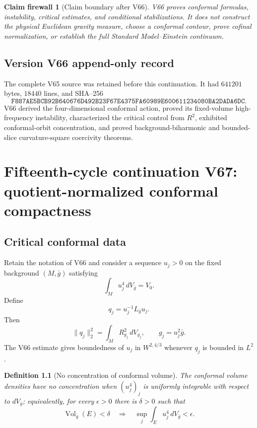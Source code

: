 \documentclass[11pt]{article}
\newtheorem{definition}[theorem]{Definition}
\newtheorem{firewall}[theorem]{Claim firewall}
\theoremstyle{remark}
\begin{document}
\begin{firewall}[Claim boundary after V66]
\label{fire:v15v66}
V66 proves conformal formulas, instability, critical estimates,
and conditional stabilizations.  It does not construct the
physical Euclidean gravity measure, choose a conformal contour,
prove cofinal normalization, or establish the full
Standard Model--Einstein continuum.
\end{firewall}

\section*{Version V66 append-only record}
The complete V65 source was retained before this continuation.  It
had \(641201\) bytes, \(18440\) lines, and SHA--256
\[
 \texttt{F887AE5BCB92B640676D492B23F67E4375FA60989E600611234080BA2DADA6DC}.
\]
V66 derived the four-dimensional conformal action, proved its
fixed-volume high-frequency instability, characterized the
critical control from \(R^2\), exhibited conformal-orbit
concentration, and proved background-biharmonic and bounded-slice
curvature-square coercivity theorems.

\chapter{Fifteenth-cycle continuation V67: quotient-normalized conformal compactness}
\label{sec:v15v67}

\section{Critical conformal data}

Retain the notation of V66 and consider a sequence \(u_j>0\) on
the fixed background \((M,\bar g)\) satisfying
\[
 \int_Mu_j^4\,dV_{\bar g}=V_0.                         \tag{67.1}
\]
Define
\[
 q_j=u_j^{-1}L_{\bar g}u_j.                           \tag{67.2}
\]
Then
\[
 \|q_j\|_2^2
 =
 \int_MR_{g_j}^2\,dV_{g_j},\qquad g_j=u_j^2\bar g.     \tag{67.3}
\]
The V66 estimate gives boundedness of \(u_j\) in
\(W^{2,4/3}\) whenever \(q_j\) is bounded in \(L^2\).

\begin{definition}[No concentration of conformal volume]
\label{def:v15v67-equi}
The conformal volume densities have no concentration when
\((u_j^4)_j\) is uniformly integrable with respect to
\(dV_{\bar g}\); equivalently, for every \(\epsilon>0\) there is
\(\delta>0\) such that
\[
 \operatorname{Vol}_{\bar g}(E)<\delta
 \quad\Longrightarrow\quad
 \sup_j\int_Eu_j^4\,dV_{\bar g}<\epsilon.              \tag{67.4}
\]
\end{definition}
\end{document}
